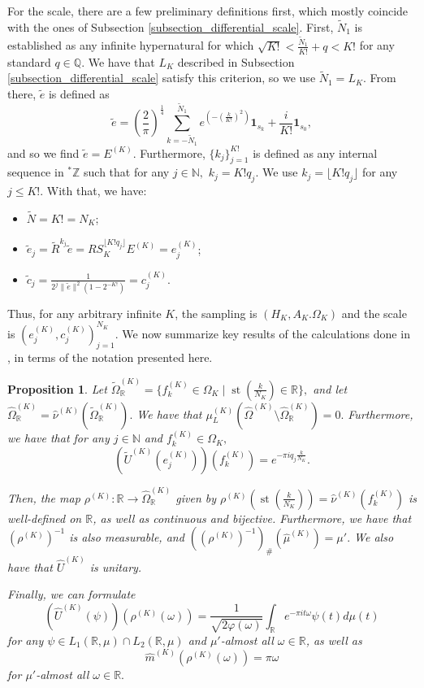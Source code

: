 \documentclass{amsart}
\newtheorem{prop}[thm]{Proposition}
\theoremstyle{definition}
\theoremstyle{remark}
\def \St{\operatorname{st}}
\def \HOM{\hat{\Omega}}
\def \HMU{\hat{\mu}}
\def \HNU{\hat{\nu}}
\def \HU{\hat{U}}
\def \Hm{\hat{m}}
\begin{document}
For the scale, there are a few preliminary definitions first, which mostly coincide with the ones of Subsection \ref{subsection_differential_scale}. First, $\tilde{N}_1$ is established as any infinite hypernatural for which $\sqrt{K!}<\frac{\tilde{N}_1}{K!}+q<K!$ for any standard $q\in\mathbb{Q}.$ We have that $L_K$ described in Subsection \ref{subsection_differential_scale} satisfy this criterion, so we use $\tilde{N}_1=L_K$. From there, $\tilde{e}$ is defined as $$\tilde{e}=\left(\frac{2}{\pi}\right)^{\frac{1}{4}}\sum_{k=-\tilde{N}_1}^{\tilde{N}_1}e^{(-(\frac{k}{K!})^2)}\mathbf{1}_{s_k}+\frac{i}{K!}\mathbf{1}_{s_0},$$ and so we find $\tilde{e}=E^{(K)}.$ Furthermore, $\{k_j\}_{j=1}^{K!}$ is defined as any internal sequence in ${}^*\mathbb{Z}$ such that for any $j\in\mathbb{N},$ $k_j=K! q_j.$ We use $k_j=\lfloor K! q_j \rfloor$ for any $j\leq K!.$ With that, we have:

\begin{itemize}
	\item $\tilde{N}=K!=N_K$;
	\item $\tilde{e}_j=\tilde{R}^{k_j}\tilde{e}=RS_K^{\lfloor K! q_j \rfloor}E^{(K)}=e_j^{(K)}$;
	\item $\tilde{c}_j=\frac{1}{2^j\|\tilde{e}\|^2(1-2^{-K!})}=c_j^{(K)}.$
\end{itemize}

Thus, for any arbitrary infinite $K$, the sampling is $(H_K, A_K. \Omega_K)$ and the scale is $(e_j^{(K)},c_j^{(K)})_{j=1}^{N_K}$. We now summarize key results of the calculations done in \cite{nonez2024spectralequivalencesnonstandardsamplings}, in terms of the notation presented here.

\begin{prop}\label{proposition_nsa_differential}
	Let $\tilde{\Omega}_{\mathbb{R}}^{(K)}=\{f_k^{(K)}\in\Omega_K\;|\; \St(\frac{k}{N_K})\in\mathbb{R}\},$ and let $\hat{\Omega}_{\mathbb{R}}^{(K)}=\HNU^{(K)}(\tilde{\Omega}_{\mathbb{R}}^{(K)}).$ We have that $\mu_L^{(K)}(\HOM^{(K)}\setminus\hat{\Omega}_{\mathbb{R}}^{(K)})=0.$ Furthermore, we have that for any $j\in\mathbb{N}$ and $f_k^{(K)}\in\Omega_K,$ $$(\tilde{U}^{(K)}(e_j^{(K)}))(f_k^{(K)})=e^{-\pi i q_j\frac{k}{N_K}}.$$
	
	Then, the map $\rho^{(K)}:\mathbb{R}\rightarrow \hat{\Omega}_{\mathbb{R}}^{(K)}$ given by $\rho^{(K)}(\St(\frac{k}{N_K}))=\HNU^{(K)}(f_k^{(K)})$ is well-defined on $\mathbb{R}$, as well as continuous and bijective. Furthermore, we have that $(\rho^{(K)})^{-1}$ is also measurable, and $\left((\rho^{(K)})^{-1}\right)_{\#}(\HMU^{(K)})=\mu'.$ We also have that $\HU^{(K)}$ is unitary.
	
	Finally, we can formulate $$(\HU^{(K)}(\psi))(\rho^{(K)}(\omega))=\frac{1}{\sqrt{2\varphi(\omega)}}\int_{\mathbb{R}}e^{-\pi i t\omega }\psi(t)d\mu(t)$$ for any $\psi\in L_1(\mathbb{R},\mu)\cap L_2(\mathbb{R},\mu) $ and $\mu'$-almost all $\omega\in \mathbb{R}$, as well as	$$\Hm^{(K)}(\rho^{(K)}(\omega))=\pi\omega$$ for $\mu'$-almost all $\omega\in\mathbb{R} .$
\end{prop}
\end{document}
